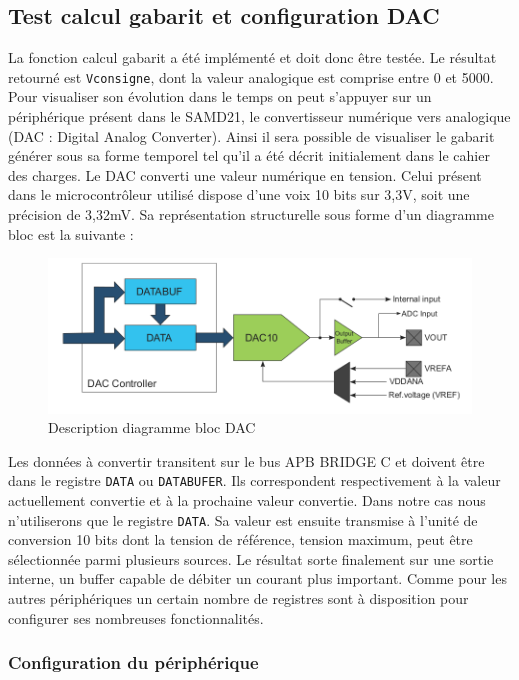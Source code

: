 \documentclass[a4paper]{article}
\begin{document}
	\subsection{Test calcul gabarit et configuration DAC}
	La fonction calcul gabarit a été implémenté et doit donc être testée. Le résultat retourné est \texttt{Vconsigne}, dont la valeur analogique est comprise entre 0 et 5000. Pour visualiser son évolution dans le temps on peut s'appuyer sur un périphérique présent dans le SAMD21, le convertisseur numérique vers analogique (DAC : Digital Analog Converter). Ainsi il sera possible de visualiser le gabarit générer sous sa forme temporel tel qu'il a été décrit initialement dans le cahier des charges. Le DAC converti une valeur numérique en tension. Celui présent dans le microcontrôleur utilisé dispose d'une voix 10 bits sur 3,3V, soit une précision de 3,32mV. Sa représentation structurelle sous forme d'un diagramme bloc est la suivante :
	\begin{figure}[H]
		\centering
		\includegraphics[width=0.6\linewidth]{DAC}
		\caption{Description diagramme bloc DAC}
	\end{figure}
	Les données à convertir transitent sur le bus APB BRIDGE C et doivent être dans le registre \texttt{DATA} ou \texttt{DATABUFER}. Ils correspondent respectivement à la valeur actuellement convertie et à la prochaine valeur convertie. Dans notre cas nous n'utiliserons que le registre \texttt{DATA}. Sa valeur est ensuite transmise à l'unité de conversion 10 bits dont la tension de référence, tension maximum, peut être sélectionnée parmi plusieurs sources. Le résultat sorte finalement sur une sortie interne, un buffer capable de débiter un courant plus important. Comme pour les autres périphériques un certain nombre de registres sont à disposition pour configurer ses nombreuses fonctionnalités.
	\subsubsection{Configuration du périphérique}
\end{document}
